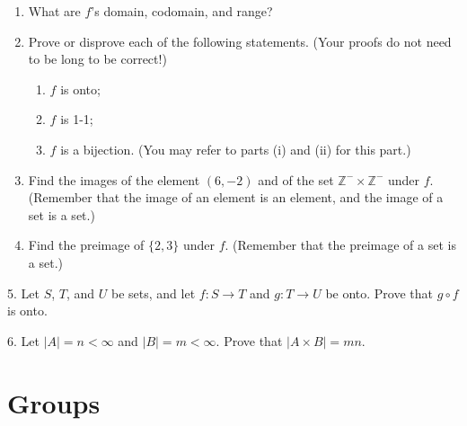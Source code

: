 \documentclass[10pt,]{book}
\theoremstyle{plain}
\theoremstyle{definition}
\theoremstyle{definition}
\theoremstyle{definition}
\theoremstyle{definition}
\numberwithin{equation}{section}
\def\Z{\mathbb{Z}}
\newcommand{\lt}{<}
\begin{document}
\begin{exerciselist}
\leavevmode%
\begin{enumerate}[label=(\alph*)]
\item\hypertarget{li-39}{}What are \(f\)'s domain, codomain, and range?%
\item\hypertarget{li-40}{}Prove or disprove each of the following statements. (Your proofs do not need to be long to be correct!)%
%
\begin{enumerate}[label=\roman*.]
\item\hypertarget{li-41}{}\(f\) is onto;%
\item\hypertarget{li-42}{}\(f\) is 1-1;%
\item\hypertarget{li-43}{}\(f\) is a bijection. (You may refer to parts (i) and (ii) for this part.)%
\end{enumerate}
\item\hypertarget{li-44}{}Find the images of the element \((6,-2)\) and of the set \(\Z^- \times \Z^-\) under \(f\). (Remember that the image of an element is an element, and the image of a set is a set.)%
\item\hypertarget{li-45}{}Find the preimage of \(\{2,3\}\) under \(f\). (Remember that the preimage of a set is a set.)%
\end{enumerate}
\par\smallskip
\item[5.]\hypertarget{exercise-5}{}Let \(S\), \(T\), and \(U\) be sets, and let \(f: S\to T\) and \(g: T\to U\) be onto. Prove that \(g \circ f\) is onto.%
\par\smallskip
\item[6.]\hypertarget{exercise-6}{}Let \(|A|=n\lt \infty\) and \(|B|=m\lt  \infty\). Prove that \(|A\times B|=mn\).%
\par\smallskip
\end{exerciselist}
\typeout{************************************************}
\typeout{************************************************}
\chapter[{Groups}]{Groups}\label{gps}
\typeout{************************************************}
\typeout{************************************************}
\end{document}
